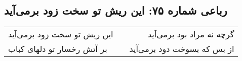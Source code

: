 \begin{center}
\section*{رباعی شماره ۷۵: این ریش تو سخت زود برمی‌آید}
\label{sec:075}
\begin{longtable}{l p{0.5cm} r}
این ریش تو سخت زود برمی‌آید
&&
گرچه نه مراد بود برمی‌آید
\\
بر آتش رخسار تو دلهای کباب
&&
از بس که بسوخت دود برمی‌آید
\\
\end{longtable}
\end{center}
